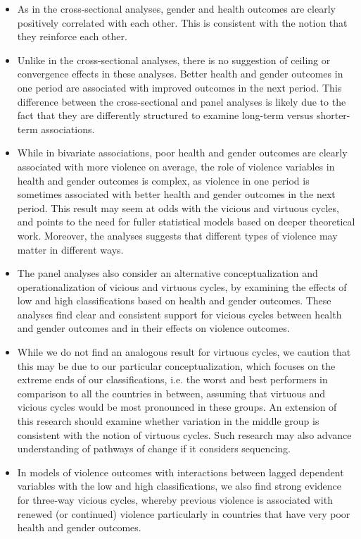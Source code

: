 \documentclass[12pt]{article}
\begin{document}
\begin{itemize}
\item As in the cross-sectional analyses, gender and health outcomes are clearly positively correlated with each other. This is consistent with the notion that they reinforce each other.
\item Unlike in the cross-sectional analyses, there is no suggestion of ceiling or convergence effects in these analyses. Better health and gender outcomes in one period are associated with improved outcomes in the next period. This difference between the cross-sectional and panel analyses is likely due to the fact that they are differently structured to examine long-term versus shorter-term associations.
\item While in bivariate associations, poor health and gender outcomes are clearly associated with more violence on average, the role of violence variables in health and gender outcomes is complex, as violence in one period is sometimes associated with better health and gender outcomes in the next period. This result may seem at odds with the vicious and virtuous cycles, and points to the need for fuller statistical models based on deeper theoretical work. Moreover, the analyses suggests that different types of violence may matter in different ways.
\item The panel analyses also consider an alternative conceptualization and operationalization of vicious and virtuous cycles, by examining the effects of low and high classifications based on health and gender outcomes. These analyses find clear and consistent support for vicious cycles between health and gender outcomes and in their effects on violence outcomes.
\item While we do not find an analogous result for virtuous cycles, we caution that this may be due to our particular conceptualization, which focuses on the extreme ends of our classifications, i.e. the worst and best performers in comparison to all the countries in between, assuming that virtuous and vicious cycles would be most pronounced in these groups. An extension of this research should examine whether variation in the middle group is consistent with the notion of virtuous cycles. Such research may also advance understanding of pathways of change if it considers sequencing.
\item In models of violence outcomes with interactions between lagged dependent variables with the low and high classifications, we also find strong evidence for three-way vicious cycles, whereby previous violence is associated with renewed (or continued) violence particularly in countries that have very poor health and gender outcomes.
\end{itemize}
\end{document}
